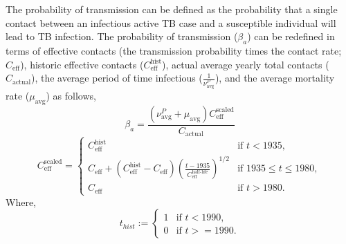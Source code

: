 \documentclass[11pt,twoside]{bristolthesis}
\begin{document}
  The probability of transmission can be defined as the probability that a single contact between an infectious active TB case and a susceptible individual will lead to TB infection. The probability of transmission (\(\beta_a\)) can be redefined in terms of effective contacts (the transmission probability times the contact rate; \(C_{\text{eff}}\)), historic effective contacts (\(C^{\text{hist}}_{\text{eff}}\)), actual average yearly total contacts (\(C_{\text{actual}}\)), the average period of time infectious (\(\frac{1}{\nu_{\text{avg}}^{P}}\)), and the average mortality rate (\(\mu_{\text{avg}}\)) as follows,
  \begin{equation}
  \beta_a = \frac{(\nu_{\text{avg}}^{P} + \mu_{\text{avg}}) C^{\text{scaled}}_{\text{eff}}}{C_{\text{actual}}}
  \label{eq:beta-eq}
  \end{equation}
  \begin{equation}
  C^{\text{scaled}}_{\text{eff}} = \begin{cases}
  C^{\text{hist}}_{\text{eff}} & \text{if } t < 1935, \\
  C_{\text{eff}} + \left(C^{\text{hist}}_{\text{eff}} -  C_{\text{eff}} \right) \left(\frac{t-1935}{C^{\text{half-life}}_{\text{eff}}}\right)^{1/2} & \text{if } 1935 \leq t \leq 1980, \\
  C_{\text{eff}} & \text{if } t > 1980. \end{cases}
    \label{eq:scaled-contacts}
  \end{equation}
  Where,
  \begin{equation}
  t_{hist}  := \begin{cases}
  1 & \text{if } t < 1990, \\
  0 & \text{if } t >= 1990. \end{cases}
  \end{equation}
\end{document}

